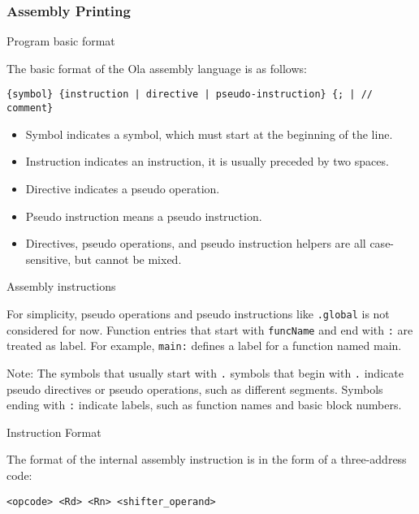 \subsubsection{Assembly Printing}

Program basic format\par
The basic format of the Ola assembly language is as follows:
\begin{lstlisting}[language={}]
{symbol} {instruction | directive | pseudo-instruction} {; | // comment}
\end{lstlisting}

\begin{itemize}
    \item Symbol indicates a symbol, which must start at the beginning of the line.\par
    \item Instruction indicates an instruction, it is usually preceded by two spaces.\par
    \item Directive indicates a pseudo operation.\par
    \item Pseudo instruction means a pseudo instruction.\par
    \item Directives, pseudo operations, and pseudo instruction helpers are all case-sensitive, but cannot be mixed.
\end{itemize}

Assembly instructions\par

For simplicity, pseudo operations and pseudo instructions like \texttt{.global} is not considered for now.
Function entries that start with \texttt{funcName} and end with \texttt{:} are treated as label. For example, \texttt{main:} defines a label for a function named main.

Note: The symbols that usually start with \texttt{.} symbols that begin with \texttt{.} indicate pseudo directives or pseudo operations, such as different segments.
Symbols ending with \texttt{:} indicate labels, such as function names and basic block numbers.

Instruction Format\par
The format of the internal assembly instruction is in the form of a three-address code:
\begin{lstlisting}[language={}]
    <opcode> <Rd> <Rn> <shifter_operand>
\end{lstlisting}

